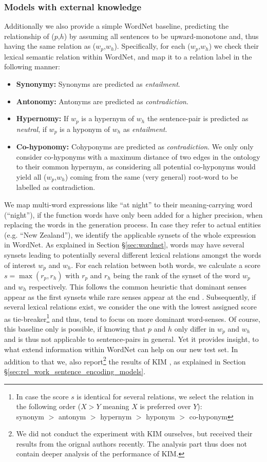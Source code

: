 \subsubsection{Models with external knowledge}
Additionally we also provide a simple WordNet baseline, predicting the relationship of ($p$,$h$) by assuming all sentences to be upward-monotone and, thus having the same relation as ($w_p$,$w_h$). Specifically, for each ($w_p$,$w_h$) we check their lexical semantic relation within WordNet, and map it to a relation label in the following manner:
\begin{itemize}
\item \textbf{Synonymy:} Synonyms are predicted as \textit{entailment}.
\item \textbf{Antonomy:} Antonyms are predicted as \textit{contradiction}.
\item \textbf{Hypernomy:} If $w_p$ is a hypernym of $w_h$ the sentence-pair is predicted as \textit{neutral}, if $w_p$ is a hyponym of $w_h$ as \textit{entailment}.
\item \textbf{Co-hyponomy:} Cohyponyms are predicted as \textit{contradiction}. We only only consider co-hyponyms with a maximum distance of two edges in the ontology to their common hypernym, as considering all potential co-hyponyms would yield all ($w_p$,$w_h$) coming from the same (very general) root-word to be labelled as contradiction.
\end{itemize}
We map multi-word expressions like ``at night'' to their meaning-carrying word (``night''), if the function words have only been added for a higher precision, when replacing the words in the generation process. In case they refer to actual entities (e.g. ``New Zealand''), we identify the applicable synsets of the whole expression in WordNet. As explained in Section §\ref{sec:wordnet}, words may have several synsets leading to potentially several different lexical relations amongst the words of interest $w_p$ and $w_h$. For each relation between both words, we calculate a score $s=\max(r_p,r_h)$ with $r_p$ and $r_h$ being the rank of the synset of the word $w_p$ and $w_h$ respectively. This follows the common heuristic that dominant senses appear as the first synsets while rare senses appear at the end \citep{mccarthy2004using}. Subsequently, if several lexical relations exist, we consider the one with the lowest assigned score as tie-breaker\footnote{In case the score $s$ is identical for several relations, we select the relation in the following order ($X > Y$ meaning $X$ is preferred over $Y$):\\ synonym $>$ antonym $>$ hypernym $>$ hyponym $>$ co-hyponym } and thus, tend to focus on more dominant word-senses. Of course, this baseline only is possible, if knowing that $p$ and $h$ only differ in $w_p$ and $w_h$ and is thus not applicable to sentence-pairs in general. Yet it provides insight, to what extend information within WordNet can help on our new test set. In addition to that we, also report\footnote{We did not conduct the experiment with \ac{KIM} ourselves, but received their results from the orignal authors recently. The analysis part thus does not contain deeper analysis of the performance of KIM.} the results of \ac{KIM} \citep{chen2017natural}, as explained in Section §\ref{sec:rel_work_sentence_encoding_models}.
